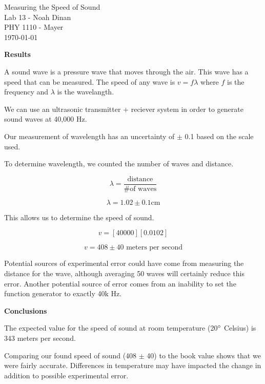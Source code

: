 \documentclass[12pt]{article}
\begin{document}
\begin{center}
\vspace*{\fill}
Measuring the Speed of Sound \\ Lab 13 - Noah Dinan \\ PHY 1110 - Mayer \\ \today \\
\vspace*{\fill}
\end{center}

\newpage
{} %
\setlength{\parindent}{0in}

\textbf{Results}\vspace{1em}

A sound wave is a pressure wave that moves through the air. This wave has a speed
that can be measured. The speed of any wave is $v = f\lambda$ where $f$ is the frequency
and $\lambda$ is the wavelangth.

We can use an ultrasonic transmitter + reciever system in order to generate sound waves at 40,000 Hz.

Our measurement of wavelength has an uncertainty of $\pm$ 0.1 based on the scale used.

To determine wavelength, we counted the number of waves and distance.

\[ \lambda = \frac{\text{distance}}{\text{\# of waves}} \]

\[ \lambda = 1.02 \pm 0.1 \text{cm} \]

This allows us to determine the speed of sound.

\[ v = [40000][0.0102] \]

\[ v = 408 \pm \text{40 meters per second}\]

Potential sources of experimental error could have come from measuring the distance for the wave,
although averaging 50 waves will certainly reduce this error. Another potential source of error comes from
an inability to set the function generator to exactly 40k Hz.

\newpage

\textbf{Conclusions}\vspace{1em}

The expected value for the speed of sound at room temperature (20$\degree$ Celsius) is 343 meters per second.

Comparing our found speed of sound (408 $\pm$ 40) to the book value shows that we were fairly accurate.
Differences in temperature may have impacted the change in addition to possible
experimental error.
\end{document}
